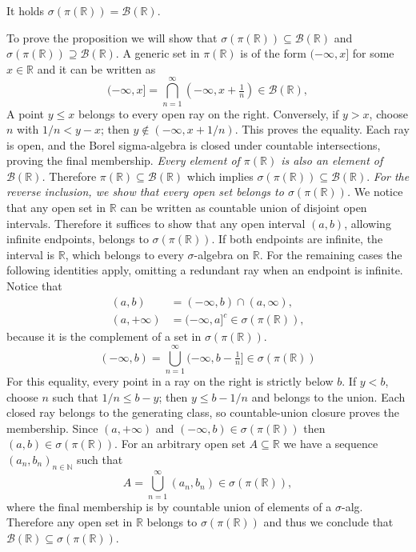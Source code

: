 \documentclass[11pt,a4paper]{article}
\newcommand{\studyheading}[1]{{\color{StudyBlue}\normalfont\bfseries\boldmath #1}}
\begin{document}
It holds $\sigma(\pi(\mathbb R))=\mathcal B(\mathbb R)$.

\par\noindent\studyheading{Proof.}\par\nobreak
To prove the proposition we will show that $\sigma(\pi(\mathbb R))\subseteq\mathcal B(\mathbb R)$ and $\sigma(\pi(\mathbb R))\supseteq\mathcal B(\mathbb R)$.
A generic set in $\pi(\mathbb R)$ is of the form $(-\infty,x]$ for some $x\in\mathbb R$ and it can be written as
\[
(-\infty,x]=\bigcap_{n=1}^\infty(-\infty,x+\tfrac1n)\in\mathcal B(\mathbb R),
\]
A point $y\le x$ belongs to every open ray on the right. Conversely, if $y>x$, choose $n$ with $1/n<y-x$; then $y\notin(-\infty,x+1/n)$. This proves the equality. Each ray is open, and the Borel sigma-algebra is closed under countable intersections, proving the final membership.
\textit{Every element of $\pi(\mathbb R)$ is also an element of $\mathcal B(\mathbb R)$.}
Therefore $\pi(\mathbb R)\subseteq\mathcal B(\mathbb R)$ which implies $\sigma(\pi(\mathbb R))\subseteq\mathcal B(\mathbb R)$.
\emph{For the reverse inclusion, we show that every open set belongs to $\sigma(\pi(\mathbb R))$.} We notice that any open set in $\mathbb R$ can be written as countable union of disjoint open intervals. Therefore it suffices to show that any open interval $(a,b)$, allowing infinite endpoints, belongs to $\sigma(\pi(\mathbb R))$.
If both endpoints are infinite, the interval is $\mathbb R$, which belongs to every $\sigma$-algebra on $\mathbb R$. For the remaining cases the following identities apply, omitting a redundant ray when an endpoint is infinite. Notice that
\[
\begin{aligned}
(a,b)&=(-\infty,b)\cap(a,\infty),\\
(a,+\infty)&=(-\infty,a]^c\in\sigma(\pi(\mathbb R)),
\end{aligned}
\]
because it is the complement of a set in $\sigma(\pi(\mathbb R))$.
\[
(-\infty,b)=\bigcup_{n=1}^\infty(-\infty,b-\tfrac1n]\in\sigma(\pi(\mathbb R))
\]
For this equality, every point in a ray on the right is strictly below $b$. If $y<b$, choose $n$ such that $1/n\le b-y$; then $y\le b-1/n$ and belongs to the union. Each closed ray belongs to the generating class, so countable-union closure proves the membership.
Since $(a,+\infty)$ and $(-\infty,b)\in\sigma(\pi(\mathbb R))$ then $(a,b)\in\sigma(\pi(\mathbb R))$.
For an arbitrary open set $A\subseteq\mathbb R$ we have a sequence $(a_n,b_n)_{n\in\mathbb N}$ such that
\[
A=\bigcup_{n=1}^\infty(a_n,b_n)\in\sigma(\pi(\mathbb R)),
\]
where the final membership is by countable union of elements of a $\sigma$-alg.
Therefore any open set in $\mathbb R$ belongs to $\sigma(\pi(\mathbb R))$ and thus we conclude that $\mathcal B(\mathbb R)\subseteq\sigma(\pi(\mathbb R))$.
%
\end{document}
